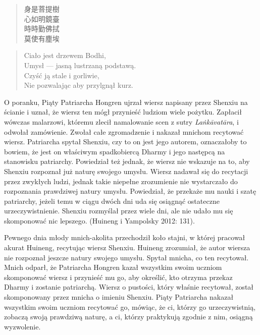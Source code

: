 \vspace*{6pt}
\begin{minipage}[t]{0.4\textwidth}
\begin{verse}
身是菩提樹\\
心如明鏡臺\\
時時勤佛拭\\
莫使有塵埃
\end{verse}
\end{minipage}
\begin{minipage}[t]{0.6\textwidth}
\itshape
\begin{verse}
Ciało jest drzewem Bodhi,\\
Umysł --- jasną lustrzaną podstawą.\\
Czyść ją stale i gorliwie,\\
Nie pozwalając aby przylgnął kurz.\fnm
\end{verse}
\end{minipage}
\label{ShenxiuVerse}
\vspace*{6pt}

O poranku, Piąty Patriarcha Hongren ujrzał wiersz napisany przez Shenxiu na ścianie i uznał, że wiersz ten mógł przynieść ludziom wiele pożytku. Zapłacił wówczas malarzowi, któremu zlecił namalowanie scen z sutry \textit{Laṅkāvatāra}, i odwołał zamówienie. Zwołał całe zgromadzenie i nakazał mnichom recytować wiersz. Patriarcha spytał Shenxiu, czy to on jest jego autorem, oznaczałoby to bowiem, że jest on właściwym spadkobiercą Dharmy i jego następcą na stanowisku patriarchy. Powiedział też jednak, że wiersz nie wskazuje na to, aby Shenxiu rozpoznał już naturę swojego umysłu. Wiersz nadawał się do recytacji przez zwykłych ludzi, jednak takie niepełne zrozumienie nie wystarczało do rozpoznania prawdziwej natury umysłu. Powiedział, że przekaże mu nauki i szatę patriarchy, jeżeli temu w ciągu dwóch dni uda się osiągnąć ostateczne urzeczywistnienie. Shenxiu rozmyślał przez wiele dni, ale nie udało mu się skomponować nic lepszego. (Huineng i Yampolsky 2012: 131).

Pewnego dnia młody mnich-akolita przechodził koło stajni, w której pracował akurat Huineng, recytując wiersz Shenxiu. Huineng zrozumiał, że autor wiersza nie rozpoznał jeszcze natury swojego umysłu. Spytał mnicha, co ten recytował. Mnich odparł, że Patriarcha Hongren kazał wszystkim swoim uczniom skomponować wiersz i przynieść mu go, aby określić, kto otrzyma przekaz Dharmy i zostanie patriarchą. Wiersz o pustości, który właśnie recytował, został skomponowany przez mnicha o imieniu Shenxiu. Piąty Patriarcha nakazał wszystkim swoim uczniom recytować go, mówiąc, że ci, którzy go urzeczywistnią, zobaczą swoją prawdziwą naturę, a ci, którzy praktykują zgodnie z nim, osiągną wyzwolenie.

